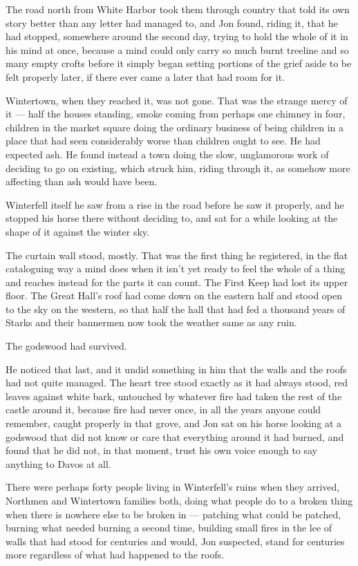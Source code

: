 The road north from White Harbor took them through country that told its own story better than any letter had managed to, and Jon found, riding it, that he had stopped, somewhere around the second day, trying to hold the whole of it in his mind at once, because a mind could only carry so much burnt treeline and so many empty crofts before it simply began setting portions of the grief aside to be felt properly later, if there ever came a later that had room for it.

Wintertown, when they reached it, was not gone. That was the strange mercy of it — half the houses standing, smoke coming from perhaps one chimney in four, children in the market square doing the ordinary business of being children in a place that had seen considerably worse than children ought to see. He had expected ash. He found instead a town doing the slow, unglamorous work of deciding to go on existing, which struck him, riding through it, as somehow more affecting than ash would have been.

Winterfell itself he saw from a rise in the road before he saw it properly, and he stopped his horse there without deciding to, and sat for a while looking at the shape of it against the winter sky.

\sceneBreak

The curtain wall stood, mostly. That was the first thing he registered, in the flat cataloguing way a mind does when it isn’t yet ready to feel the whole of a thing and reaches instead for the parts it can count. The First Keep had lost its upper floor. The Great Hall’s roof had come down on the eastern half and stood open to the sky on the western, so that half the hall that had fed a thousand years of Starks and their bannermen now took the weather same as any ruin.

The godswood had survived.

He noticed that last, and it undid something in him that the walls and the roofs had not quite managed. The heart tree stood exactly as it had always stood, red leaves against white bark, untouched by whatever fire had taken the rest of the castle around it, because fire had never once, in all the years anyone could remember, caught properly in that grove, and Jon sat on his horse looking at a godswood that did not know or care that everything around it had burned, and found that he did not, in that moment, trust his own voice enough to say anything to Davos at all.

\sceneBreak

There were perhaps forty people living in Winterfell’s ruins when they arrived, Northmen and Wintertown families both, doing what people do to a broken thing when there is nowhere else to be broken in — patching what could be patched, burning what needed burning a second time, building small fires in the lee of walls that had stood for centuries and would, Jon suspected, stand for centuries more regardless of what had happened to the roofs.


